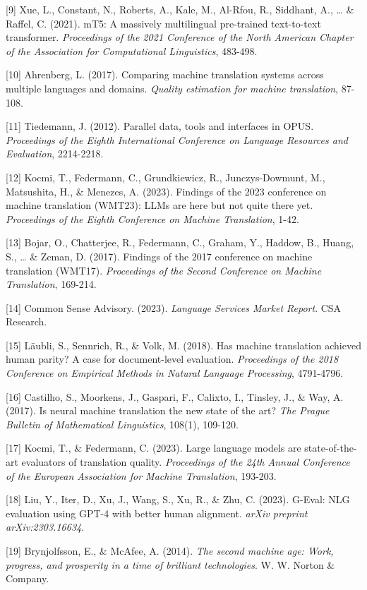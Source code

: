 \documentclass[12pt,a4paper]{article}
\begin{document}
{{{{{{[}9{]} Xue, L., Constant, N., Roberts, A., Kale, M., Al-Rfou, R.,
Siddhant, A., \ldots{} \& Raffel, C. (2021). mT5: A massively
multilingual pre-trained text-to-text transformer. \emph{Proceedings of
the 2021 Conference of the North American Chapter of the Association for
Computational Linguistics}, 483-498.

{[}10{]} Ahrenberg, L. (2017). Comparing machine translation systems
across multiple languages and domains. \emph{Quality estimation for
machine translation}, 87-108.

{[}11{]} Tiedemann, J. (2012). Parallel data, tools and interfaces in
OPUS. \emph{Proceedings of the Eighth International Conference on
Language Resources and Evaluation}, 2214-2218.

{[}12{]} Kocmi, T., Federmann, C., Grundkiewicz, R., Junczys-Dowmunt,
M., Matsushita, H., \& Menezes, A. (2023). Findings of the 2023
conference on machine translation (WMT23): LLMs are here but not quite
there yet. \emph{Proceedings of the Eighth Conference on Machine
Translation}, 1-42.

{[}13{]} Bojar, O., Chatterjee, R., Federmann, C., Graham, Y., Haddow,
B., Huang, S., \ldots{} \& Zeman, D. (2017). Findings of the 2017
conference on machine translation (WMT17). \emph{Proceedings of the
Second Conference on Machine Translation}, 169-214.

{[}14{]} Common Sense Advisory. (2023). \emph{Language Services Market
Report}. CSA Research.

{[}15{]} Läubli, S., Sennrich, R., \& Volk, M. (2018). Has machine
translation achieved human parity? A case for document-level evaluation.
\emph{Proceedings of the 2018 Conference on Empirical Methods in Natural
Language Processing}, 4791-4796.

{[}16{]} Castilho, S., Moorkens, J., Gaspari, F., Calixto, I., Tinsley,
J., \& Way, A. (2017). Is neural machine translation the new state of
the art? \emph{The Prague Bulletin of Mathematical Linguistics}, 108(1),
109-120.

{[}17{]} Kocmi, T., \& Federmann, C. (2023). Large language models are
state-of-the-art evaluators of translation quality. \emph{Proceedings of
the 24th Annual Conference of the European Association for Machine
Translation}, 193-203.

{[}18{]} Liu, Y., Iter, D., Xu, J., Wang, S., Xu, R., \& Zhu, C. (2023).
G-Eval: NLG evaluation using GPT-4 with better human alignment.
\emph{arXiv preprint arXiv:2303.16634}.

{[}19{]} Brynjolfsson, E., \& McAfee, A. (2014). \emph{The second
machine age: Work, progress, and prosperity in a time of brilliant
technologies}. W. W. Norton \& Company.

}}}}}
\end{document}
